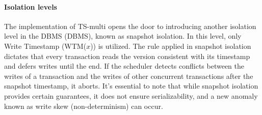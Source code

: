 \paragraph*{Isolation levels}
The implementation of TS-multi opens the door to introducing another isolation level in the DBMS (DBMS), known as snapshot isolation.
In this level, only Write Timestamp (WTM($x$)) is utilized.
The rule applied in snapshot isolation dictates that every transaction reads the version consistent with its timestamp and defers writes until the end. 
If the scheduler detects conflicts between the writes of a transaction and the writes of other concurrent transactions after the snapshot timestamp, it aborts.
It's essential to note that while snapshot isolation provides certain guarantees, it does not ensure serializability, and a new anomaly known as write skew (non-determinism) can occur.